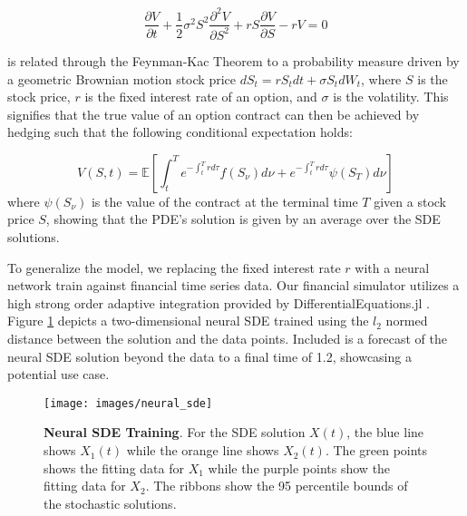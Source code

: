 \documentclass{juliacon}
\begin{document}
\[
    \frac{\partial V}{\partial t} + \frac{1}{2}\sigma^2 S^2 \frac{\partial^2 V}{\partial S^2} + rS\frac{\partial V}{\partial S} - rV = 0
\]

    is related through the Feynman-Kac Theorem to a probability measure driven by a geometric Brownian motion stock price $dS_t = r S_t dt + \sigma S_t dW_t$, where $S$ is the stock price, $r$ is the fixed interest rate of an option, and $\sigma$ is the volatility. This signifies that the true value of an option contract can then be achieved by hedging such that the following conditional expectation holds:

\[
    V(S,t) = \mathbb{E} \left[\int_t^T e^{-\int_t^T rd\tau}f(S_\nu)d\nu + e^{-\int_t^T rd\tau}\psi(S_T)d\nu    \right]
\]
    where $\psi(S_\nu)$ is the value of the contract at the terminal time $T$ given a stock price $S$, showing that the PDE's solution is given by an average over the SDE solutions. 

    To generalize the model, we replacing the fixed interest rate $r$ with a neural network train against financial time series data. Our financial simulator utilizes a high strong order adaptive integration provided by DifferentialEquations.jl \cite{DifferentialEquations.jl-2017,Rackauckas2017ADAPTIVEMF}.  Figure \ref{fig:neuralsde} depicts a two-dimensional neural SDE trained using the $l_2$ normed distance between the solution and the data points. Included is a forecast of the neural SDE solution beyond the data to a final time of 1.2, showcasing a potential use case.

\begin{figure}[!htb]
  \centering\texttt{[image: images/neural\_sde]}
  \caption{{\bf Neural SDE Training}. For the SDE solution $X(t)$, the blue line shows $X_1(t)$ while the orange line shows $X_2(t)$. The green points shows the fitting data for $X_1$ while the purple points show the fitting data for $X_2$. The ribbons show the 95 percentile bounds of the stochastic solutions.}\label{fig:neuralsde}
\end{figure}
\end{document}
